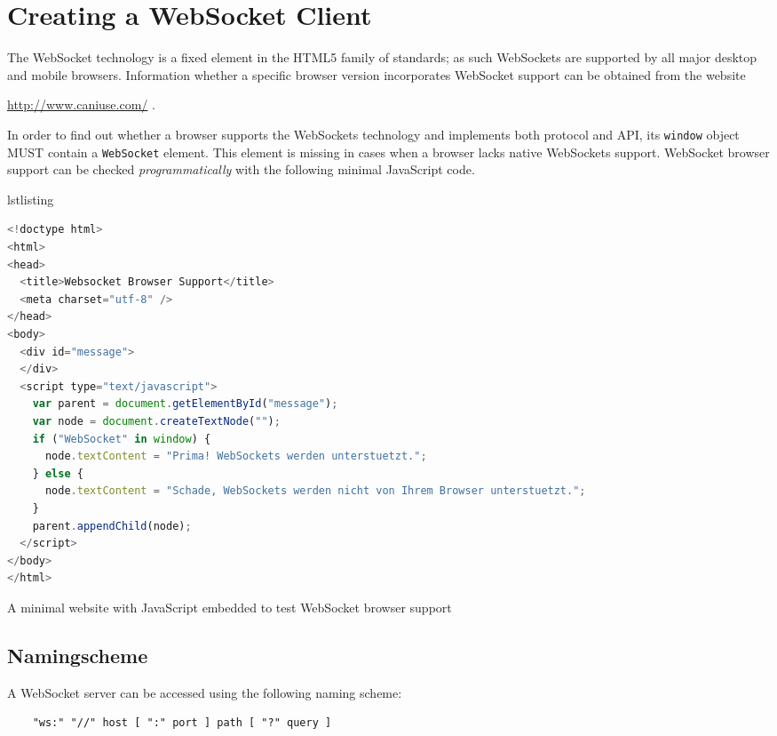 \documentclass[a4paper, justified, notoc]{tufte-handout} %
\makeatletter
\newenvironment{listing}[1][htbp] %
  {\ifvmode\else\unskip\fi\begin{@tufte@float}[#1]{lstlisting}{}}
  {\end{@tufte@float} } %
\makeatother
\begin{document}
\section{Creating a WebSocket Client} %
\label{sec:creating_a_websocket_client}
The WebSocket technology is a fixed element in the HTML5 family of standards; as such WebSockets are supported by all major desktop and mobile browsers. Information whether a specific browser version incorporates WebSocket support can be obtained from the website 

\url{http://www.caniuse.com/} .

In order to find out whether a browser supports the WebSockets technology and implements both protocol and API, its \texttt{window} object MUST contain a \texttt{WebSocket} element. This element is missing in cases when a browser lacks native WebSockets support. WebSocket browser support can be checked \emph{programmatically} with the following minimal JavaScript code.

\begin{listing}
\begin{lstlisting}[language=JavaScript]
<!doctype html>
<html>
<head>
  <title>Websocket Browser Support</title>
  <meta charset="utf-8" />
</head>
<body>
  <div id="message">
  </div>
  <script type="text/javascript">
    var parent = document.getElementById("message");
    var node = document.createTextNode("");
    if ("WebSocket" in window) {
      node.textContent = "Prima! WebSockets werden unterstuetzt.";
    } else {
      node.textContent = "Schade, WebSockets werden nicht von Ihrem Browser unterstuetzt.";
    }
    parent.appendChild(node);
  </script>
</body>
</html>
\end{lstlisting}
	\caption{A minimal website with JavaScript embedded to test WebSocket browser support} 
	\label{plain_server}
\end{listing}
 
\subsection{Namingscheme} %
\label{sub:namingscheme}

A WebSocket server can be accessed using the following naming scheme:
\begin{Verbatim}
	"ws:" "//" host [ ":" port ] path [ "?" query ]
\end{Verbatim}
\end{document}
